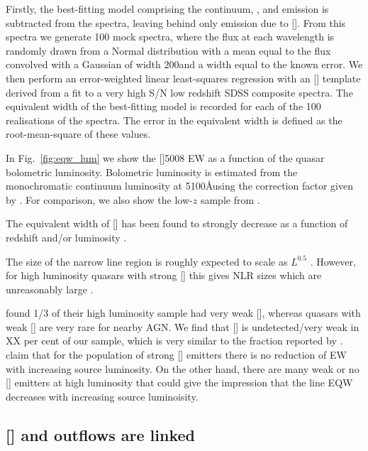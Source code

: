Firstly, the best-fitting model comprising the continuum, , and \hb emission is subtracted from the spectra, leaving behind only emission due to []. 
From this spectra we generate 100 mock spectra, where the flux at each wavelength is randomly drawn from a Normal distribution with a mean equal to the flux convolved with a Gaussian of width 200\kms and a width equal to the known error. 
We then perform an error-weighted linear least-squares regression with an [] template derived from a fit to a very high \ac{S/N} low redshift SDSS composite spectra. 
The equivalent width of the best-fitting model is recorded for each of the 100 realisations of the spectra. 
The error in the equivalent width is defined as the root-mean-square of these values.

In Fig.~\ref{fig:eqw_lum} we show the []5008 EW as a function of the quasar bolometric luminosity. 
Bolometric luminosity is estimated from the monochromatic continuum luminosity at 5100\AA using the correction factor given by \citet{richards06}. 
For comparison, we also show the low-$z$ sample from \citet{shen11}.  

The equivalent width of [] has been found to strongly decrease as a function of redshift and/or luminosity \citep[e.g.][]{brotherton96,netzer04,sulentic04,baskin05b}. 

The size of the narrow line region is roughly expected to scale as $L^{0.5}$ \citep[e.g.][]{netzer04}. 
However, for high luminosity quasars with strong [] this gives \ac{NLR} sizes which are unreasonably large \citep[$\sim$100 kpc;][]{netzer04}. 

\citet{netzer04} found 1/3 of their high luminosity sample had very weak [], whereas quasars with weak [] are very rare for nearby \ac{AGN}. 
We find that [] is undetected/very weak in XX per cent of our sample, which is very similar to the fraction reported by \citet{netzer04}.  
\citet{netzer04} claim that for the population of strong [] emitters there is no reduction of EW with increasing source luminosity. 
On the other hand, there are many weak or no [] emitters at high luminosity that could give the impression that the line \ac{EQW} decreases with increasing source luminoisity. 


\subsection{[] and  outflows are linked}

